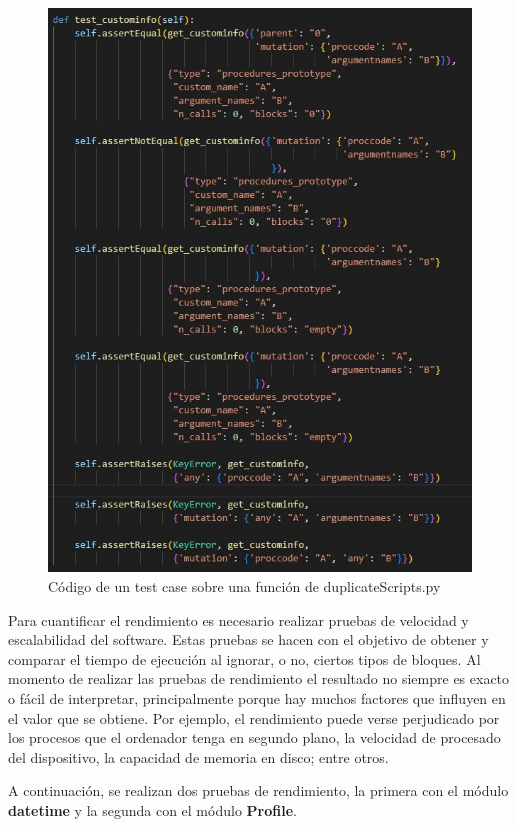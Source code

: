 \documentclass[a4paper, 12pt]{book}
\begin{document}
\begin{figure}[!htb]
  \centering
  \includegraphics[width=13cm, keepaspectratio]{img/code_testduplicate.jpg}
  \caption{Código de un test case sobre una función de duplicateScripts.py}
  \label{fig:code_testduplicate}
\end{figure}

\newpage 
Para cuantificar el rendimiento es necesario realizar pruebas de velocidad y escalabilidad del software. Estas pruebas se hacen con el objetivo de obtener y comparar el tiempo de ejecución al ignorar, o no, ciertos tipos de bloques. Al momento de realizar las pruebas de rendimiento el resultado no siempre es exacto o fácil de interpretar, principalmente porque hay muchos factores que influyen en el valor que se obtiene. Por ejemplo, el rendimiento puede verse perjudicado por los procesos que el ordenador tenga en segundo plano, la velocidad de procesado del dispositivo, la capacidad de memoria en disco; entre otros.

A continuación, se realizan dos pruebas de rendimiento, la primera con el módulo \textbf{datetime} y la segunda con el módulo \textbf{Profile}. 
\end{document}

